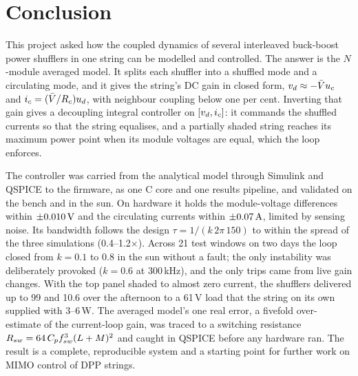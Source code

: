 \section{Conclusion}
\label{sec:conclusion}

This project asked how the coupled dynamics of several interleaved buck-boost power shufflers in one string can be modelled and controlled. The answer is the $N$-module averaged model. It splits each shuffler into a shuffled mode and a circulating mode, and it gives the string's DC gain in closed form, $v_{d} \approx -\bar{V}u_{c}$ and $i_{c} = (\bar{V}/R_c)u_{d}$, with neighbour coupling below one per cent. Inverting that gain gives a decoupling integral controller on $[v_{d}, i_{c}]$: it commands the shuffled currents so that the string equalises, and a partially shaded string reaches its maximum power point when its module voltages are equal, which the loop enforces.

The controller was carried from the analytical model through Simulink and QSPICE to the firmware, as one C core and one results pipeline, and validated on the bench and in the sun. On hardware it holds the module-voltage differences within $\pm0.010\,\mathrm{V}$ and the circulating currents within $\pm0.07\,\mathrm{A}$, limited by sensing noise. Its bandwidth follows the design $\tau = 1/(k\,2\pi\,150)$ to within the spread of the three simulations (0.4--1.2$\times$). Across 21 test windows on two days the loop closed from $k=0.1$ to 0.8 in the sun without a fault; the only instability was deliberately provoked ($k = 0.6$ at 300\,kHz), and the only trips came from live gain changes. With the top panel shaded to almost zero current, the shufflers delivered up to 99\W{} and 10.6\Wh{} over the afternoon to a 61\,V load that the string on its own supplied with 3--6\,W. The averaged model's one real error, a fivefold over-estimate of the current-loop gain, was traced to a switching resistance $R_{sw} = 64\,C_pf_{sw}^3(L+M)^2$ and caught in QSPICE before any hardware ran. The result is a complete, reproducible system and a starting point for further work on MIMO control of DPP strings.

